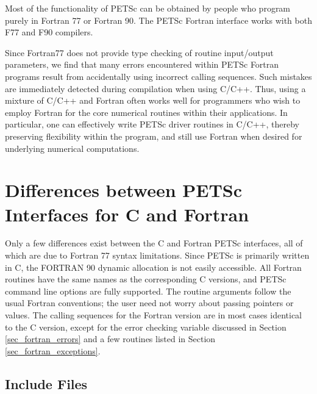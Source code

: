 Most of the functionality of PETSc can be obtained by people who
program purely in Fortran 77 or Fortran 90.  
The PETSc Fortran interface works with both F77 and F90 compilers.

Since Fortran77 does not provide type checking of routine input/output
parameters, we find that many errors encountered within PETSc Fortran
programs result from accidentally using incorrect calling sequences.
Such mistakes are immediately detected during compilation when using
C/C++.  Thus, using a mixture of C/C++ and Fortran often works well
for programmers who wish to employ Fortran for the core numerical
routines within their applications.  In particular, one can
effectively write PETSc driver routines in C/C++, thereby preserving
flexibility within the program, and still use Fortran when desired for
underlying numerical computations.

\section{Differences between PETSc Interfaces for C and Fortran}

Only a few differences exist between the C and Fortran PETSc
interfaces, all of which are due to Fortran 77 syntax limitations.
Since PETSc is primarily written in C, the FORTRAN 90 
dynamic allocation is not easily accessible.
All Fortran routines have the same names as the corresponding C
versions, and PETSc command line options are fully supported. The
routine arguments follow the usual Fortran conventions; the user need
not worry about passing pointers or values.  The calling sequences
for the Fortran version are in most cases identical to the C version,
except for the error checking variable discussed in 
Section \ref{sec_fortran_errors} and a few routines listed in 
Section \ref{sec_fortran_exceptions}.

\subsection{Include Files}
\label{sec_fortran_includes}

